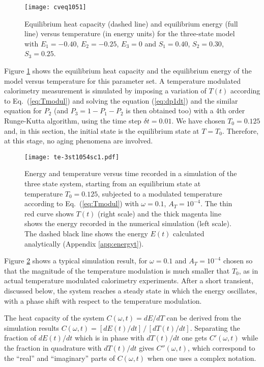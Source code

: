 \documentclass[pre,a4paper,twocolumn,superscriptaddress,%
floatfix]{revtex4}
\newcommand{\dtac}{\ensuremath{A_T}}
\begin{document}
\begin{figure}[h]
  \centering
  \texttt{[image: cveq1051]}
  \caption{Equilibrium heat capacity (dashed line) and equilibrium
    energy (full line)
    versus temperature (in energy units) for the three-state model with
  $E_1 = -0.40$, $E_2 = -0.25$, $E_3 = 0$ and $S_1 = 0.40$, $S_2 = 0.30$, $S_3
  = 0.25$.  }
  \label{fig:ceequil}
\end{figure}

Figure \ref{fig:ceequil} shows the equilibrium heat capacity and
the equilibrium energy of the model
versus temperature for this parameter set. A temperature modulated calorimetry
measurement 
is simulated by imposing a variation of $T(t)$ according to
Eq.~(\ref{eq:Tmodul}) and solving the equation (\ref{eq:dp1dt}) and the similar
equation for $P_2$ (and $P_3 = 1 - P_1 - P_2$ is then obtained too)
with a 4th order Runge-Kutta
algorithm, using the time step $\delta t = 0.01$.
We have chosen $T_0 = 0.125$ and, in this section, the initial state is the
equilibrium state at $T=T_0$. Therefore, at this stage, no
  aging phenomena are involved.

\begin{figure}[h]
  \centering
  \texttt{[image: te-3st1054sc1.pdf]}
  \caption{Energy and temperature versus time recorded in a simulation of the
    three state system, starting from an equilibrium state at
    temperature $T_0 = 0.125$, subjected to a
    modulated temperature according to Eq.~(\ref{eq:Tmodul}) with
    $\omega = 0.1$, $\dtac = 10^{-4}$. The thin red curve shows $T(t)$ (right
    scale) and the thick magenta line shows the energy recorded in the
    numerical simulation (left scale).
    The dashed black line shows the energy $E(t)$ calculated
    analytically (Appendix \ref{app:energyt}).
  }
  \label{fig:te1054}
\end{figure}

\medskip
Figure \ref{fig:te1054} shows a typical simulation result, for $\omega = 0.1$
and $\dtac = 10^{-4}$ chosen so that the magnitude of the temperature
modulation is much smaller that $T_0$, as in actual temperature modulated
calorimetry 
experiments. After a short transient, discussed below, the system reaches a
steady state in which the energy oscillates, with a phase shift with respect
to the temperature modulation.

The heat capacity of the system $C(\omega,t) = dE/dT$ can be derived
from the simulation results $C(\omega,t) =
[dE(t)/dt]\,/\,[dT(t)/dt]$. Separating the
fraction of $dE(t)/dt$ which is in phase with $dT(t)/dt$ one gets
$C'(\omega,t)$ while the fraction in quadrature with $dT(t)/dt$ gives
$C''(\omega,t)$, which correspond to the ``real'' and ``imaginary'' parts of 
$C(\omega,t)$ when one uses a complex notation.
\end{document}
